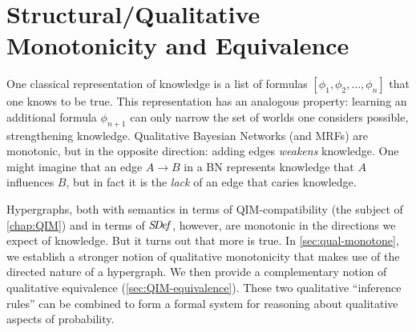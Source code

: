 

\section{Structural/Qualitative Monotonicity and Equivalence}

One classical representation of knowledge is a list of formulas
    $[ \phi_1, \phi_2, \ldots, \phi_n]$
    that one knows to be true.
This representation has an analogous property:
    learning an additional formula $\phi_{n+1}$
    can only narrow the set of worlds one considers possible,
    strengthening knowledge. 
Qualitative Bayesian Networks (and MRFs) are monotonic,
	but in the opposite direction:
        adding edges \emph{weakens} knowledge.
One might imagine that an edge $A{\to}B$
	in a BN represents knowledge that $A$ influences $B$, 
	but in fact it is the \emph{lack} of an edge that caries knowledge.

Hypergraphs, both with semantics in terms of QIM-compatibility (the subject of \cref{chap:QIM}) and in terms of $\mathit{S\mskip-3.5muD\mskip-2.5mue\mskip-1.5muf}$, however, are monotonic in the directions we expect of knowledge.
But it turns out that more is true. 
In \cref{sec:qual-monotone}, we establish a stronger notion of qualitative monotonicity that makes use of the directed nature of a hypergraph. 
We then provide a complementary notion of qualitative equivalence (\cref{sec:QIM-equivalence}). 
These two qualitative ``inference rules'' can be combined to form a formal system for reasoning about qualitative aspects of probability. 

